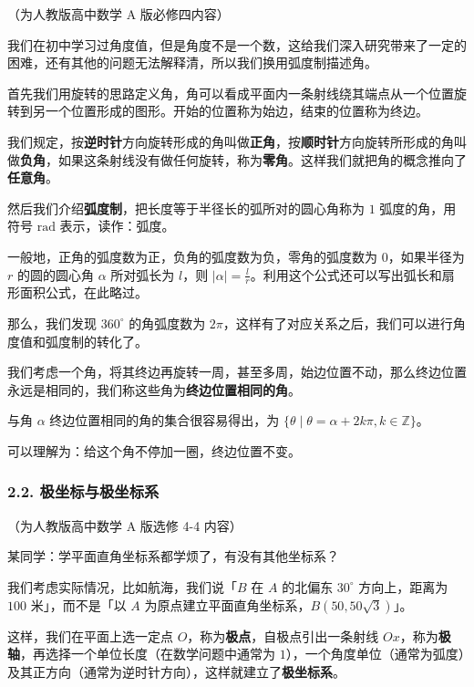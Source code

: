 （为人教版高中数学 A 版必修四内容）

我们在初中学习过角度值，但是角度不是一个数，这给我们深入研究带来了一定的困难，还有其他的问题无法解释清，所以我们换用弧度制描述角。

首先我们用旋转的思路定义角，角可以看成平面内一条射线绕其端点从一个位置旋转到另一个位置形成的图形。开始的位置称为始边，结束的位置称为终边。

我们规定，按\textbf{逆时针}方向旋转形成的角叫做\textbf{正角}，按\textbf{顺时针}方向旋转所形成的角叫做\textbf{负角}，如果这条射线没有做任何旋转，称为\textbf{零角}。这样我们就把角的概念推向了\textbf{任意角}。

然后我们介绍\textbf{弧度制}，把长度等于半径长的弧所对的圆心角称为 $1$ 弧度的角，用符号 $\text{rad}$ 表示，读作：弧度。

一般地，正角的弧度数为正，负角的弧度数为负，零角的弧度数为 $0$，如果半径为 $r$ 的圆的圆心角 $\alpha$ 所对弧长为 $l$，则 $|\alpha|=\frac{l}{r}$。利用这个公式还可以写出弧长和扇形面积公式，在此略过。

那么，我们发现 $360^\circ$ 的角弧度数为 $2\pi$，这样有了对应关系之后，我们可以进行角度值和弧度制的转化了。

我们考虑一个角，将其终边再旋转一周，甚至多周，始边位置不动，那么终边位置永远是相同的，我们称这些角为\textbf{终边位置相同的角}。

与角 $\alpha$ 终边位置相同的角的集合很容易得出，为 $\{\theta\mid \theta=\alpha+2k\pi,k\in \mathbb{Z}\}$。

可以理解为：给这个角不停加一圈，终边位置不变。

\subsubsection{2.2. 极坐标与极坐标系}

（为人教版高中数学 A 版选修 4-4 内容）

\begin{QUOTE}{}{}
某同学：学平面直角坐标系都学烦了，有没有其他坐标系？
\end{QUOTE}

我们考虑实际情况，比如航海，我们说「$B$ 在 $A$ 的北偏东 $30^\circ$ 方向上，距离为 $100$ 米」，而不是「以 $A$ 为原点建立平面直角坐标系，$B(50,50\sqrt 3)$」。

这样，我们在平面上选一定点 $O$，称为\textbf{极点}，自极点引出一条射线 $Ox$，称为\textbf{极轴}，再选择一个单位长度（在数学问题中通常为 $1$），一个角度单位（通常为弧度）及其正方向（通常为逆时针方向），这样就建立了\textbf{极坐标系}。

